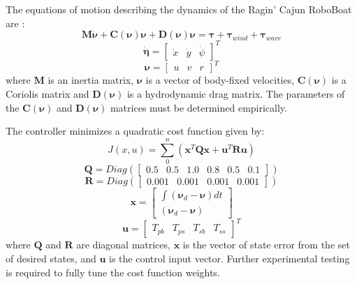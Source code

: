 \documentclass[letterpaper, 12 pt, conference]{ieeeconf}
\begin{document}
The equations of motion describing the dynamics of the Ragin' Cajun RoboBoat are \cite{Fossen:94a, Fossen:11a}:
%
\begin{equation}
\label{eq:EOM_No_Current}
\bm{M}\dot{\bm{\nu}} + \bm{C}(\bm{\nu})\bm{\nu} + \bm{D}(\bm{\nu})\bm{\nu} = \bm{\tau} + \bm{\tau}_{wind} + \bm{\tau}_{wave}
\end{equation}
%
%
\begin{equation}
\label{eq:GlobalVelo}
\dot{\bm{\eta}} =
\left[
\begin{matrix}
\dot{x} & \dot{y} & \dot\psi
\end{matrix}
\right]^T
\end{equation}
%
\begin{equation}
\label{eq:BodyVelo}
\bm{\nu} = \left[
\begin{matrix}
u & v & r
\end{matrix}
\right]^T
\end{equation}
%
where $\bm{M}$ is an inertia matrix, $\bm{\nu}$ is a vector of body-fixed velocities, $\bm{C}\left(\bm{\nu}\right)$ is a Coriolis matrix and $\bm{D}\left(\bm{\nu}\right)$ is a hydrodynamic drag matrix. The parameters of the $\bm{C}\left(\bm{\nu}\right)$  and $\bm{D}\left(\bm{\nu}\right)$ matrices must be determined empirically.

The controller minimizes a quadratic cost function given by:
%
\begin{equation}
\label{eq:cost_function}
J\left(x, u\right) = \sum_0^n \left(\bm{x}^T \bm{Q} \bm{x} + \bm{u}^T \bm{R} \bm{u}\right)
\end{equation}
%
\begin{equation}
\label{eq:Q_matrix}
\bm{Q} = Diag\left(\left[
\begin{matrix}
0.5 & 0.5 & 1.0 & 0.8 & 0.5 & 0.1 %
\end{matrix}
\right]
\right)
\end{equation}
%
\begin{equation}
\label{eq:R_matrix}
\bm{R} = Diag\left(\left[
\begin{matrix}
0.001 & 0.001 & 0.001 & 0.001
\end{matrix}
\right]\right)
\end{equation}
%
\begin{equation}
\label{eq:state_vector}
\bm{x} = \left[
\begin{matrix}
\int\left(\bm{\nu}_d - \bm{\nu}\right)dt\\
\left(\bm{\nu}_d - \bm{\nu}\right)
\end{matrix}
\right]
\end{equation}
%
\begin{equation}
\label{eq:control_vector}
\bm{u} = \left[
\begin{matrix}
T_{pb} & T_{ps} & T_{sb} & T_{ss}
\end{matrix}
\right]^T
\end{equation}
%
where $\bm{Q}$ and $\bm{R}$ are diagonal matrices, $\bm{x}$ is the vector of state error from the set of desired states, and $\bm{u}$ is the control input vector. Further experimental testing is required to fully tune the cost function weights. 
\end{document}
